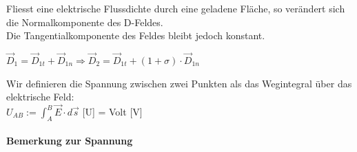 \beginip
Fliesst eine elektrische Flussdichte durch eine geladene Fläche, so verändert sich die Normalkomponente des D-Feldes. \\
Die Tangentialkomponente des Feldes bleibt jedoch konstant. \\
 \begin{center}
\end{center}
\formulaBegin
$\vec{D}_1 = \vec{D}_{1t} + \vec{D}_{1n} \Rightarrow \vec{D}_2 = \vec{D}_{1t} + (1 + \sigma) \cdot \vec{D}_{1n}$
\formulaEnd
\iend


\beginip
Wir definieren die Spannung zwischen zwei Punkten als das Wegintegral über das elektrische Feld: \\
\formulaBegin
$ U_{AB} :=  \int_A^B \vec{E} \cdot d\vec{s} $
\formulaEnd
{[U]} = Volt {[V]}
\iend

\paragraph{Bemerkung zur Spannung}

